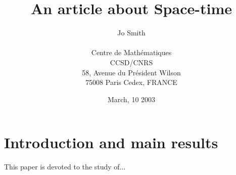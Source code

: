 \documentclass[11pt]{article}
\begin{document}
\title{An article about Space-time}

\date{March, 10 2003}

\author{Jo Smith\\
	\\
        Centre de Math\'ematiques\\
	CCSD/CNRS\\
	58, Avenue du Pr\'esident Wilson\\
	75008 Paris Cedex, FRANCE\\}
 
\maketitle



\section{Introduction and main results}

This paper is devoted to the study of...
\end{document}
